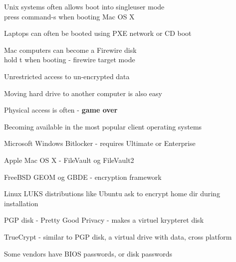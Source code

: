 \documentclass[20pt,landscape,a4paper,footrule]{foils}
\begin{document}
\begin{list1}
\item Unix systems often allows boot into singleuser mode\\
press command-s when booting Mac OS X
\item Laptops can often be booted using PXE network or CD boot
\item Mac computers can become a Firewire disk\\
hold t when booting - firewire target mode
\item Unrestricted access to un-encrypted data
\item Moving hard drive to another computer is also easy
\end{list1}
\pause
\centerline{Physical access is often - {\bf game over}}




\begin{list1}
\item Becoming available in the most popular client operating systems
\begin{list2}
\item Microsoft Windows Bitlocker - requires Ultimate or Enterprise
\item Apple Mac OS X - FileVault og FileVault2
\item FreeBSD GEOM og GBDE - encryption framework
\item Linux LUKS distributions like Ubuntu ask to encrypt home dir during installation
\item PGP disk - Pretty Good Privacy - makes a virtuel krypteret disk
\item TrueCrypt - similar to PGP disk, a virtual drive with data, cross platform
\item Some vendors have BIOS passwords, or disk passwords
\end{list2}
\end{list1}



\end{document}
